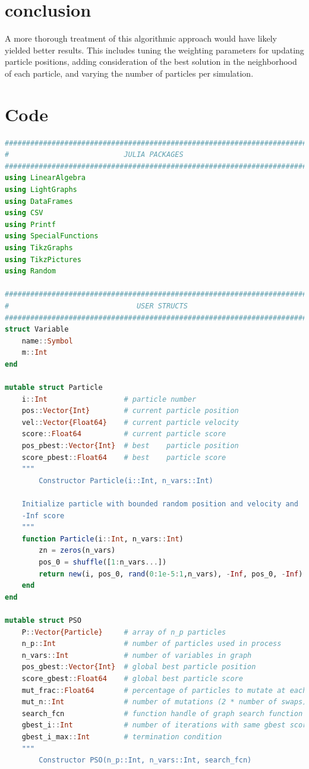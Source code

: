 \documentclass[twoside,11pt]{article}
\begin{document}
\section{conclusion}
A more thorough treatment of this algorithmic approach would have likely yielded better results. This includes tuning the weighting parameters for updating particle positions, adding consideration of the best solution in the neighborhood of each particle, and varying the number of particles per simulation.

\section{Code}
\begin{algorithm}
\begin{lstlisting}[language=Julia]
########################################################################
#                           JULIA PACKAGES                             #
########################################################################
using LinearAlgebra
using LightGraphs
using DataFrames
using CSV
using Printf
using SpecialFunctions
using TikzGraphs
using TikzPictures
using Random

########################################################################
#                              USER STRUCTS                            #
########################################################################
struct Variable
    name::Symbol
    m::Int
end

mutable struct Particle
    i::Int                  # particle number
    pos::Vector{Int}        # current particle position
    vel::Vector{Float64}    # current particle velocity
    score::Float64          # current particle score
    pos_pbest::Vector{Int}  # best    particle position
    score_pbest::Float64    # best    particle score
    """
        Constructor Particle(i::Int, n_vars::Int)

    Initialize particle with bounded random position and velocity and
    -Inf score
    """
    function Particle(i::Int, n_vars::Int)
        zn = zeros(n_vars)
        pos_0 = shuffle([1:n_vars...])
        return new(i, pos_0, rand(0:1e-5:1,n_vars), -Inf, pos_0, -Inf)
    end
end

mutable struct PSO
    P::Vector{Particle}     # array of n_p particles
    n_p::Int                # number of particles used in process
    n_vars::Int             # number of variables in graph
    pos_gbest::Vector{Int}  # global best particle position
    score_gbest::Float64    # global best particle score
    mut_frac::Float64       # percentage of particles to mutate at each iteration
    mut_n::Int              # number of mutations (2 * number of swaps)
    search_fcn              # function handle of graph search function
    gbest_i::Int            # number of iterations with same gbest score
    gbest_i_max::Int        # termination condition
    """
        Constructor PSO(n_p::Int, n_vars::Int, search_fcn)


\end{lstlisting}
\end{algorithm}
\end{document}
